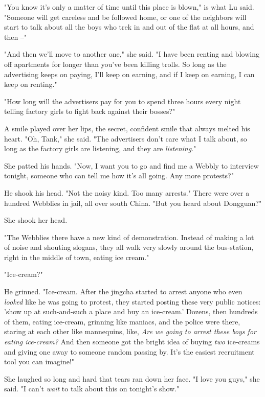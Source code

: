 "You know it's only a matter of time until this place is blown," is
what Lu said. "Someone will get careless and be followed home, or
one of the neighbors will start to talk about all the boys who trek
in and out of the flat at all hours, and then --"

"And then we'll move to another one," she said. "I have been
renting and blowing off apartments for longer than you've been
killing trolls. So long as the advertising keeps on paying, I'll
keep on earning, and if I keep on earning, I can keep on renting."

"How long will the advertisers pay for you to spend three hours
every night telling factory girls to fight back against their
bosses?"

A smile played over her lips, the secret, confident smile that
always melted his heart. "Oh, Tank," she said. "The advertisers
don't care what I talk about, so long as the factory girls are
listening, and they are \emph{listening}."

She patted his hands. "Now, I want you to go and find me a Webbly
to interview tonight, someone who can tell me how it's all going.
Any more protests?"

He shook his head. "Not the noisy kind. Too many arrests." There
were over a hundred Webblies in jail, all over south China. "But
you heard about Dongguan?"

She shook her head.

"The Webblies there have a new kind of demonstration. Instead of
making a lot of noise and shouting slogans, they all walk very
slowly around the bus-station, right in the middle of town, eating
ice cream."

"Ice-cream?"

He grinned. "Ice-cream. After the jingcha started to arrest anyone
who even \emph{looked} like he was going to protest, they started
posting these very public notices: 'show up at such-and-such a
place and buy an ice-cream.' Dozens, then hundreds of them, eating
ice-cream, grinning like maniacs, and the police were there,
staring at each other like mannequins, like,
\emph{Are we going to arrest these boys for eating ice-cream?} And
then someone got the bright idea of buying \emph{two} ice-creams
and giving one away to someone random passing by. It's the easiest
recruitment tool you can imagine!"

She laughed so long and hard that tears ran down her face. "I love
you guys," she said. "I can't \emph{wait} to talk about this on
tonight's show."


